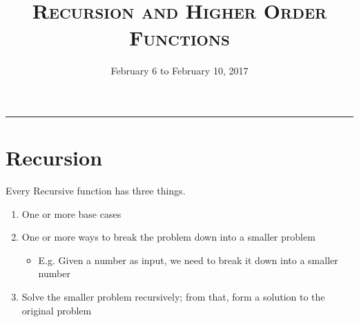 \documentclass{exam}
\title{\textsc{Recursion and Higher Order Functions}}
\date{February 6 to February 10, 2017}
\begin{document}
\maketitle
\rule{\textwidth}{0.15em}
\fontsize{12}{15}\selectfont


\section{Recursion}

Every Recursive function has three things.
\begin{enumerate}
\item One or more base cases
\item One or more ways to break the problem down into a smaller problem
\begin{itemize}
\item E.g. Given a number as input, we need to break it down into a smaller number
\end{itemize}
\item Solve the smaller problem recursively; from that, form a solution to the original problem
\end{enumerate}
\end{document}
